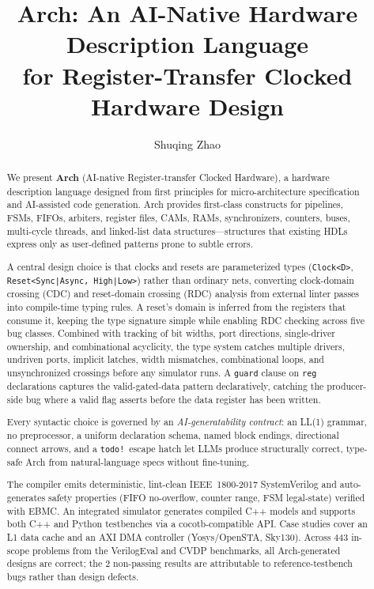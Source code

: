 \documentclass[manuscript]{acmart}
\title{Arch: An AI-Native Hardware Description Language\\for Register-Transfer Clocked Hardware Design}
\author{Shuqing Zhao}
\begin{document}
\begin{abstract}
We present \textbf{Arch} (AI-native Register-transfer Clocked Hardware), a hardware description language designed from first principles for micro-architecture specification and AI-assisted code generation. Arch provides first-class constructs for pipelines, FSMs, FIFOs, arbiters, register files, CAMs, RAMs, synchronizers, counters, buses, multi-cycle threads, and linked-list data structures---structures that existing HDLs express only as user-defined patterns prone to subtle errors.

A central design choice is that clocks and resets are parameterized types (\texttt{Clock<D>}, \texttt{Reset<Sync|Async, High|Low>}) rather than ordinary nets, converting clock-domain crossing (CDC) and reset-domain crossing (RDC) analysis from external linter passes into compile-time typing rules. A reset's domain is inferred from the registers that consume it, keeping the type signature simple while enabling RDC checking across five bug classes. Combined with tracking of bit widths, port directions, single-driver ownership, and combinational acyclicity, the type system catches multiple drivers, undriven ports, implicit latches, width mismatches, combinational loops, and unsynchronized crossings before any simulator runs. A \texttt{guard} clause on \texttt{reg} declarations captures the valid-gated-data pattern declaratively, catching the producer-side bug where a valid flag asserts before the data register has been written.

Every syntactic choice is governed by an \emph{AI-generatability contract}: an LL(1) grammar, no preprocessor, a uniform declaration schema, named block endings, directional connect arrows, and a \texttt{todo!}\ escape hatch let LLMs produce structurally correct, type-safe Arch from natural-language specs without fine-tuning.

The compiler emits deterministic, lint-clean IEEE~1800-2017 SystemVerilog and auto-generates safety properties (FIFO no-overflow, counter range, FSM legal-state) verified with EBMC. An integrated simulator generates compiled C++ models and supports both C++ and Python testbenches via a cocotb-compatible API. Case studies cover an L1 data cache and an AXI DMA controller (Yosys/OpenSTA, Sky130). Across 443 in-scope problems from the VerilogEval and CVDP benchmarks, all Arch-generated designs are correct; the 2 non-passing results are attributable to reference-testbench bugs rather than design defects.
\end{abstract}
\end{document}
